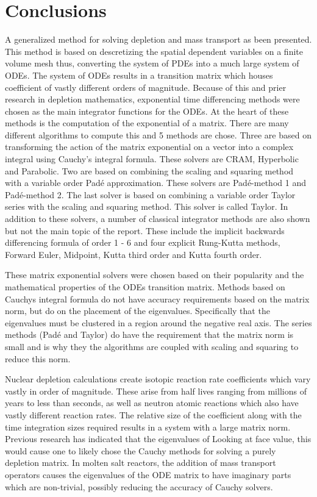 \chapter{Conclusions} \label{ch:conclusions}
A generalized method for solving depletion and mass transport as been presented. This method is based on descretizing the spatial dependent variables on a finite volume mesh thus, converting the system of PDEs into a much large system of ODEs. The system of ODEs results in a transition matrix which houses coefficient of vastly different orders of magnitude. Because of this and prier research in depletion mathematics, exponential time differencing methods were chosen as the main integrator functions for the ODEs. At the heart of these methods is the computation of the exponential of a matrix. There are many different algorithms to compute this and 5 methods are chose. Three are based on transforming the action of the matrix exponential on a vector into a complex integral using Cauchy's integral formula. These solvers are CRAM, Hyperbolic and Parabolic. Two are based on combining the scaling and squaring method with a variable order Pad\'e approximation. These solvers are Pad\'e-method 1 and Pad\'e-method 2. The last solver is based on combining a variable order Taylor series with the scaling and squaring method. This solver is called Taylor. In addition to these solvers, a number of classical integrator methods are also shown but not the main topic of the report. These include the implicit backwards differencing formula of order 1 - 6 and four explicit Rung-Kutta methods, Forward Euler, Midpoint, Kutta third order and Kutta fourth order. 

These matrix exponential solvers were chosen based on their popularity and the mathematical properties of the ODEs transition matrix. Methods based on Cauchys integral formula do not have accuracy requirements based on the matrix norm, but do on the placement of the eigenvalues. Specifically that the eigenvalues must be clustered in a region around the negative real axis. The series methods (Pad\'e and Taylor) do have the requirement that the matrix norm is small and is why they the algorithms are coupled with scaling and squaring to reduce this norm. 

Nuclear depletion calculations create isotopic reaction rate coefficients which vary vastly in order of magnitude. These arise from half lives ranging from millions of years to less than seconds, as well as neutron atomic reactions which also have vastly different reaction rates. The relative size of the coefficient along with the time integration sizes required results in a system with a large matrix norm. Previous research has indicated that the eigenvalues of Looking at face value, this would cause one to likely chose the Cauchy methods for solving a purely depletion matrix. In molten salt reactors, the addition of mass transport operators causes the eigenvalues of the ODE matrix to have imaginary parts which are non-trivial, possibly reducing the accuracy of Cauchy solvers. 

